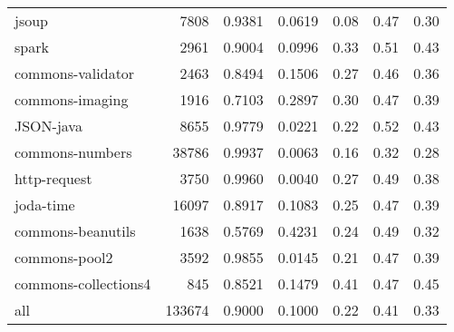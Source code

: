 \begin{table*}
\begin{tabular}{lrrrrrr}
                  jsoup &    7808 &          0.9381 &          0.0619 &         0.08 &         0.47 &             0.30 \\
                  spark &    2961 &          0.9004 &          0.0996 &         0.33 &         0.51 &             0.43 \\
      commons-validator &    2463 &          0.8494 &          0.1506 &         0.27 &         0.46 &             0.36 \\
        commons-imaging &    1916 &          0.7103 &          0.2897 &         0.30 &         0.47 &             0.39 \\
              JSON-java &    8655 &          0.9779 &          0.0221 &         0.22 &         0.52 &             0.43 \\
        commons-numbers &   38786 &          0.9937 &          0.0063 &         0.16 &         0.32 &             0.28 \\
           http-request &    3750 &          0.9960 &          0.0040 &         0.27 &         0.49 &             0.38 \\
              joda-time &   16097 &          0.8917 &          0.1083 &         0.25 &         0.47 &             0.39 \\
      commons-beanutils &    1638 &          0.5769 &          0.4231 &         0.24 &         0.49 &             0.32 \\
          commons-pool2 &    3592 &          0.9855 &          0.0145 &         0.21 &         0.47 &             0.39 \\
   commons-collections4 &     845 &          0.8521 &          0.1479 &         0.41 &         0.47 &             0.45 \\
                    all &  133674 &          0.9000 &          0.1000 &         0.22 &         0.41 &             0.33 \\
\bottomrule
\end{tabular}
\end{table*}
